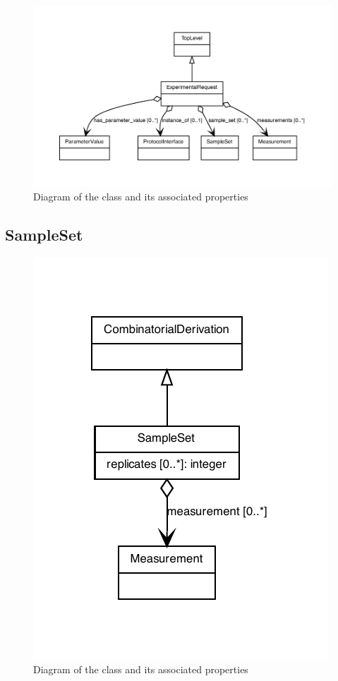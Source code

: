 \begin{figure}[ht]
\begin{center}
\includegraphics[scale=0.6]{figures/ExperimentalRequest}
\caption[]{Diagram of the  class and its associated properties}
\label{uml:ExperimentRequest}
\end{center}
\end{figure}


\subsection{SampleSet}
\label{sec:SampleSet}

\begin{figure}[ht]
\begin{center}
\includegraphics[scale=0.6]{figures/SampleSet}
\caption[]{Diagram of the  class and its associated properties}
\label{uml:SampleSet}
\end{center}
\end{figure}


